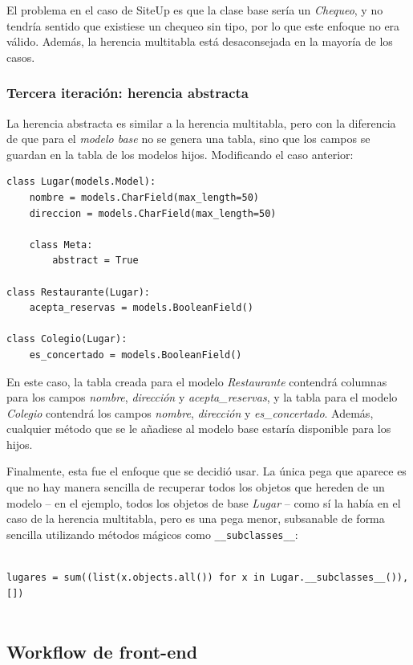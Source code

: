 El problema en el caso de SiteUp es que la clase base sería un \textit{Chequeo},
y no tendría sentido que existiese un chequeo sin tipo, por lo que este enfoque
no era válido. Además, la herencia multitabla está desaconsejada en la mayoría
de los casos.

\subsubsection{Tercera iteración: herencia abstracta}

La herencia abstracta es similar a la herencia multitabla, pero con la
diferencia de que para el \textit{modelo base} no se genera una tabla, sino que
los campos se guardan en la tabla de los modelos hijos. Modificando el caso
anterior:

\begin{verbatim}
class Lugar(models.Model):
    nombre = models.CharField(max_length=50)
    direccion = models.CharField(max_length=50)

    class Meta:
        abstract = True

class Restaurante(Lugar):
    acepta_reservas = models.BooleanField()

class Colegio(Lugar):
    es_concertado = models.BooleanField()
\end{verbatim}

En este caso, la tabla creada para el modelo \textit{Restaurante} contendrá
columnas para los campos \textit{nombre}, \textit{dirección} y
\textit{acepta\_reservas}, y la tabla para el modelo \textit{Colegio} contendrá
los campos \textit{nombre}, \textit{dirección} y
\textit{es\_concertado}. Además, cualquier método que se le añadiese al modelo
base estaría disponible para los hijos.

Finalmente, esta fue el enfoque que se decidió usar. La única pega que aparece
es que no hay manera sencilla de recuperar todos los objetos que hereden de un
modelo -- en el ejemplo, todos los objetos de base \textit{Lugar} -- como sí la
había en el caso de la herencia multitabla, pero es una pega menor, subsanable
de forma sencilla utilizando métodos mágicos como \texttt{\_\_subclasses\_\_}:

\begin{verbatim}

lugares = sum((list(x.objects.all()) for x in Lugar.__subclasses__()), [])
  
\end{verbatim}

\subsection{Workflow de front-end}
\label{sec:frontend}


